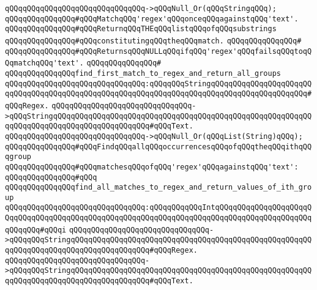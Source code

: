 \verb|qQQqqQQqqQQqqQQqqQQqqQQqqQQqqQQq->qQQqNull_Or(qQQqStringqQQq);|\newline
\newline
\verb|qQQqqQQqqQQqqQQq#qQQqMatchqQQq'regex'qQQqonceqQQqagainstqQQq'text'.|\newline
\verb|qQQqqQQqqQQqqQQq#qQQqReturnqQQqTHEqQQqlistqQQqofqQQqsubstrings|\newline
\verb|qQQqqQQqqQQqqQQq#qQQqconstitutingqQQqtheqQQqmatch.|\newline
\verb|qQQqqQQqqQQqqQQq#|\newline
\verb|qQQqqQQqqQQqqQQq#qQQqReturnsqQQqNULLqQQqifqQQq'regex'qQQqfailsqQQqtoqQQqmatchqQQq'text'.|\newline
\verb|qQQqqQQqqQQqqQQq#|\newline
\verb|qQQqqQQqqQQqqQQqfind_first_match_to_regex_and_return_all_groups|\newline
\verb|qQQqqQQqqQQqqQQqqQQqqQQqqQQqqQQq:qQQqqQQqStringqQQqqQQqqQQqqQQqqQQqqQQqqQQqqQQqqQQqqQQqqQQqqQQqqQQqqQQqqQQqqQQqqQQqqQQqqQQqqQQqqQQqqQQqqQQq#qQQqRegex.|\newline
\verb|qQQqqQQqqQQqqQQqqQQqqQQqqQQqqQQq->qQQqStringqQQqqQQqqQQqqQQqqQQqqQQqqQQqqQQqqQQqqQQqqQQqqQQqqQQqqQQqqQQqqQQqqQQqqQQqqQQqqQQqqQQqqQQqqQQq#qQQqText.|\newline
\verb|qQQqqQQqqQQqqQQqqQQqqQQqqQQqqQQq->qQQqNull_Or(qQQqList(String)qQQq);|\newline
\newline
\newline
\verb|qQQqqQQqqQQqqQQq#qQQqFindqQQqallqQQqoccurrencesqQQqofqQQqtheqQQqithqQQqgroup|\newline
\verb|qQQqqQQqqQQqqQQq#qQQqmatchesqQQqofqQQq'regex'qQQqagainstqQQq'text':|\newline
\verb|qQQqqQQqqQQqqQQq#qQQq|\newline
\verb|qQQqqQQqqQQqqQQqfind_all_matches_to_regex_and_return_values_of_ith_group|\newline
\verb|qQQqqQQqqQQqqQQqqQQqqQQqqQQqqQQq:qQQqqQQqqQQqIntqQQqqQQqqQQqqQQqqQQqqQQqqQQqqQQqqQQqqQQqqQQqqQQqqQQqqQQqqQQqqQQqqQQqqQQqqQQqqQQqqQQqqQQqqQQqqQQqqQQq#qQQqi|\newline
\verb|qQQqqQQqqQQqqQQqqQQqqQQqqQQqqQQq->qQQqqQQqStringqQQqqQQqqQQqqQQqqQQqqQQqqQQqqQQqqQQqqQQqqQQqqQQqqQQqqQQqqQQqqQQqqQQqqQQqqQQqqQQqqQQqqQQq#qQQqRegex.|\newline
\verb|qQQqqQQqqQQqqQQqqQQqqQQqqQQqqQQq->qQQqqQQqStringqQQqqQQqqQQqqQQqqQQqqQQqqQQqqQQqqQQqqQQqqQQqqQQqqQQqqQQqqQQqqQQqqQQqqQQqqQQqqQQqqQQqqQQq#qQQqText.|\newline
